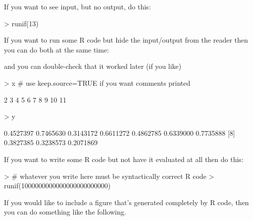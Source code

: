 \documentclass[12pt]{article}         %
\begin{document}
If you want to see input, but no output, do this:

\begin{Schunk}
\begin{Sinput}
> runif(13)
\end{Sinput}
\end{Schunk}

If you want to run some \textsf{R} code but hide the input/output from the reader then you can do both at the same time:


\bigskip   %

and you can double-check that it worked later (if you like)

\begin{Schunk}
\begin{Sinput}
> x  # use keep.source=TRUE if you want comments printed
\end{Sinput}
\begin{Soutput}
 [1]  2  3  4  5  6  7  8  9 10 11
\end{Soutput}
\begin{Sinput}
> y
\end{Sinput}
\begin{Soutput}
 [1] 0.4527397 0.7465630 0.3143172 0.6611272 0.4862785 0.6339000 0.7735888
 [8] 0.3827385 0.3238573 0.2071869
\end{Soutput}
\end{Schunk}

If you want to write some \textsf{R} code but not have it evaluated at all then do this:

\begin{Schunk}
\begin{Sinput}
> # whatever you write here must be syntactically correct R code
> runif(1000000000000000000000000)
\end{Sinput}
\end{Schunk}

If you would like to include a figure that's generated completely by \textsf{R} code, then you can do something like the following.
\end{document}
